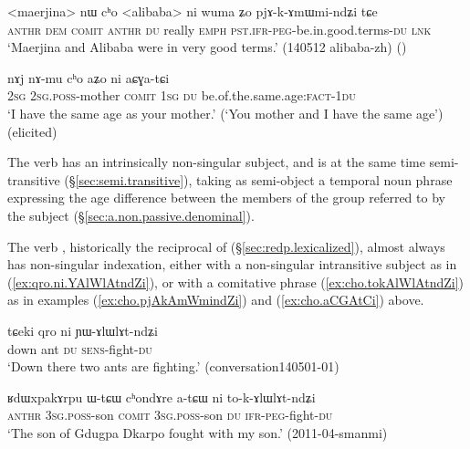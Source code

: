 \begin{exe}
\ex   \label{ex:cho.pjAkAmWmindZi}
 \gll  <maerjina> nɯ cʰo <alibaba> ni wuma ʑo pjɤ-k-ɤmɯmi-ndʑi tɕe \\
\textsc{anthr} \textsc{dem} \textsc{comit}  \textsc{anthr} \textsc{du} really \textsc{emph} \textsc{pst}.\textsc{ifr}-\textsc{peg}-be.in.good.terms-\textsc{du} \textsc{lnk} \\
\glt `Maerjina and Alibaba were in very good terms.' (140512 alibaba-zh)
()
\end{exe}

\begin{exe}
\ex   \label{ex:cho.aCGAtCi}
 \gll  nɤj nɤ-mu cʰo aʑo ni aɕɣa-tɕi \\
 \textsc{2sg} \textsc{2sg}.\textsc{poss}-mother \textsc{comit} \textsc{1sg} \textsc{du} be.of.the.same.age:\textsc{fact}-\textsc{1du} \\
 \glt `I have the same age as your mother.' (`You mother and I have the same age') (elicited)
\end{exe} 

The verb  has an intrinsically non-singular subject, and is at the same time semi-transitive (§\ref{sec:semi.transitive}), taking as semi-object a temporal noun phrase expressing the age difference between the members of the group referred to by the subject (§\ref{sec:a.non.passive.denominal}).
 
The verb , historically the reciprocal of  (§\ref{sec:redp.lexicalized}), almost always has non-singular indexation, either with a non-singular intransitive subject as in (\ref{ex:qro.ni.YAlWlAtndZi}), or with a comitative phrase (\ref{ex:cho.tokAlWlAtndZi}) as in examples (\ref{ex:cho.pjAkAmWmindZi}) and (\ref{ex:cho.aCGAtCi}) above.

\begin{exe}
\ex   \label{ex:qro.ni.YAlWlAtndZi}
 \gll  tɕeki qro ni ɲɯ-ɤlɯlɤt-ndʑi \\
 down ant \textsc{du} \textsc{sens}-fight-\textsc{du} \\
\glt `Down there two ants are fighting.' (conversation140501-01)
\end{exe}

\begin{exe}
	\ex   \label{ex:cho.tokAlWlAtndZi}
	\gll ʁdɯxpakɤrpu ɯ-tɕɯ cʰondɤre a-tɕɯ ni to-k-ɤlɯlɤt-ndʑi \\
	\textsc{anthr} \textsc{3sg}.\textsc{poss}-son \textsc{comit}  \textsc{3sg}.\textsc{poss}-son \textsc{du} \textsc{ifr}-\textsc{peg}-fight-\textsc{du} \\
	\glt `The son of Gdugpa Dkarpo fought with my son.' (2011-04-smanmi)
\end{exe}


